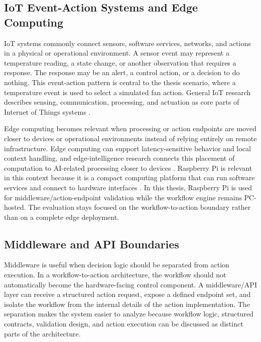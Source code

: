 \subsection{IoT Event-Action Systems and Edge Computing}\label{subsec:iot-edge}

IoT systems commonly connect sensors, software services, networks, and actions in a physical or operational environment. A sensor event may represent a temperature reading, a state change, or another observation that requires a response. The response may be an alert, a control action, or a decision to do nothing. This event-action pattern is central to the thesis scenario, where a temperature event is used to select a simulated fan action. General IoT research describes sensing, communication, processing, and actuation as core parts of Internet of Things systems \cite{iotSurveyAtzori}.

Edge computing becomes relevant when processing or action endpoints are moved closer to devices or operational environments instead of relying entirely on remote infrastructure. Edge computing can support latency-sensitive behavior and local context handling, and edge-intelligence research connects this placement of computation to AI-related processing closer to devices \cite{edgeComputingSatyanarayanan,edgeIntelligenceZhou2019}. Raspberry Pi is relevant in this context because it is a compact computing platform that can run software services and connect to hardware interfaces \cite{raspberryPiDocs}. In this thesis, Raspberry Pi is used for middleware/action-endpoint validation while the workflow engine remains PC-hosted. The evaluation stays focused on the workflow-to-action boundary rather than on a complete edge deployment.

\subsection{Middleware and API Boundaries}\label{subsec:middleware-theory}

Middleware is useful when decision logic should be separated from action execution. In a workflow-to-action architecture, the workflow should not automatically become the hardware-facing control component. A middleware/API layer can receive a structured action request, expose a defined endpoint set, and isolate the workflow from the internal details of the action implementation. The separation makes the system easier to analyze because workflow logic, structured contracts, validation design, and action execution can be discussed as distinct parts of the architecture.

